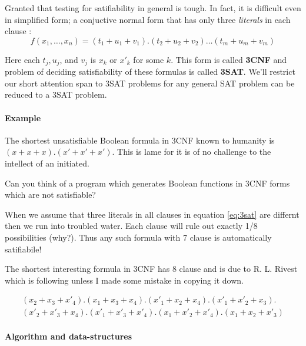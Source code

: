   Granted that testing for satifiability in general is tough. In fact, it is
  difficult even in simplified form; a conjuctive normal form that has only
  three \textit{literals} in each clause : 
  \begin{equation}
  \label{eq:3sat}
  f(x_1,\ldots,x_n) = (t_1+u_1+v_1).(t_2+u_2+v_2)\ldots(t_m+u_m+v_m)
  \end{equation}

  Here each $t_j, u_j$, and $v_j$ is $x_k$ or $x'_k$ for some $k$. This form is
  called \textbf{3CNF} and problem of deciding satisfiability of these formulas
  is called \textbf{3SAT}. We'll restrict our short attention span to 3SAT
  problems for any general SAT problem can be reduced to a 3SAT problem.

  \paragraph{Example}

  The shortest unsatisfiable Boolean formula in 3CNF known to humanity is
  $(x+x+x).(x'+x'+x')$. This is lame for it is of no challenge to the intellect of
  an initiated. 

  \begin{remark}

  Can you think of a program which generates Boolean functions in 3CNF forms
  which are not satisfiable? 
  
  \end{remark}

  When we assume that three literals in all clauses in equation \ref{eq:3sat} are
  differnt then we run into troubled water. Each clause will rule out exactly
  1/8 possibilities (why?). Thus any such formula with 7 clause is automatically
  satifiabile!
  
  The shortest interesting formula in 3CNF has 8 clause and is due to R. L.
  Rivest which is following unless I made some mistake in copying it down.

  \begin{equation}
  \label{eq:shortest_3sat}
  \begin{gathered}
  (x_2+x_3+x'_4).(x_1+x_3+x_4).(x'_1+x_2+x_4).(x'_1+x'_2+x_3). \\
  (x'_2+x'_3+x_4) .(x'_1+x'_3+x'_4).(x_1+x'_2+x'_4).(x_1+x_2+x'_3)
  \end{gathered}
  \end{equation}

  \paragraph{Algorithm and data-structures}

